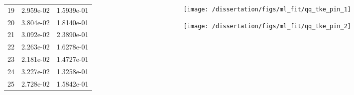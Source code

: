 \documentclass[t, pdftex]{beamer}
\begin{document}
\begin{frame}
\begin{columns}
\begin{column}{0.5\textwidth}
\begin{table}[h]
\begin{center}
\begin{tabular}[h]{|c|c|c|}
            19 & 2.959e-02 & 1.5939e-01 \\
            20 & 3.804e-02 & 1.8140e-01 \\
            21 & 3.092e-02 & 2.3890e-01 \\
            22 & 2.263e-02 & 1.6278e-01 \\
            23 & 2.181e-02 & 1.4727e-01 \\
            24 & 3.227e-02 & 1.3258e-01 \\
            25 & 2.728e-02 & 1.5842e-01 \\
            \hline
        \end{tabular}
        \label{tab:ks_tke}
    \end{center}
\end{table}
    \end{column}
    \begin{column}{0.5\textwidth}
        \begin{figure}[H]%
            \texttt{[image: /dissertation/figs/ml\_fit/qq\_tke\_pin\_1]}
        \end{figure}
        \vspace{-26pt}
        \begin{figure}[H]%
            \texttt{[image: /dissertation/figs/ml\_fit/qq\_tke\_pin\_2]}
        \end{figure}
    \end{column}
\end{columns}
\end{frame}

\end{document}
